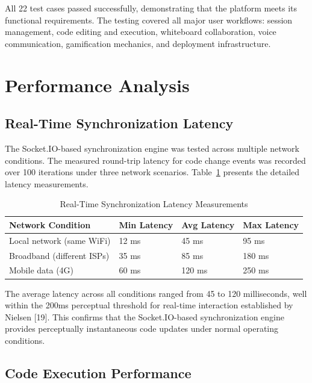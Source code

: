 All 22 test cases passed successfully, demonstrating that the platform meets its functional requirements. The testing covered all major user workflows: session management, code editing and execution, whiteboard collaboration, voice communication, gamification mechanics, and deployment infrastructure.

\section{Performance Analysis}

\subsection{Real-Time Synchronization Latency}

The Socket.IO-based synchronization engine was tested across multiple network conditions. The measured round-trip latency for code change events was recorded over 100 iterations under three network scenarios. Table~\ref{tab:latency} presents the detailed latency measurements.

\begin{table}[H]
\centering
\caption{Real-Time Synchronization Latency Measurements}
\label{tab:latency}
\begin{reporttable}
\begin{tabular}{@{} l l l l @{}}
\toprule
\textbf{Network Condition} & \textbf{Min Latency} & \textbf{Avg Latency} & \textbf{Max Latency} \\
\midrule
Local network (same WiFi) & 12 ms & 45 ms & 95 ms \\
Broadband (different ISPs) & 35 ms & 85 ms & 180 ms \\
Mobile data (4G) & 60 ms & 120 ms & 250 ms \\
\bottomrule
\end{tabular}
\end{reporttable}
\end{table}

The average latency across all conditions ranged from 45 to 120 milliseconds, well within the 200ms perceptual threshold for real-time interaction established by Nielsen [19]. This confirms that the Socket.IO-based synchronization engine provides perceptually instantaneous code updates under normal operating conditions.

\subsection{Code Execution Performance}

